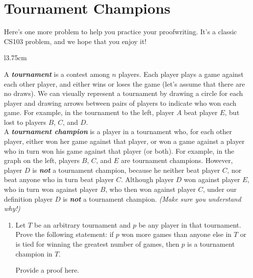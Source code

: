 \documentclass{article}
\renewcommand{\(}{\left(}
\renewcommand{\)}{\right)}
\theoremstyle{plain}
\theoremstyle{plain}
\theoremstyle{definition}
\renewcommand{\emph}[1]{\textit{\textbf{#1}}}
\begin{document}
\pagebreak

\section{Tournament Champions}
Here's one more problem to help you practice your proofwriting.
It's a classic CS103 problem,
and we hope that you enjoy it! \\

\begin{wrapfigure}{l}{3.75cm}
\end{wrapfigure}
A \emph{tournament} is a contest among $n$ players. Each player plays a game against each other player, and either wins or loses the game (let's assume that there are no draws). We can visually represent a tournament by drawing a circle for each player and drawing arrows between pairs of players to indicate who won each game. For example, in the tournament to the left, player $A$ beat player $E$, but lost to players $B$, $C$, and $D$. \\

A \emph{tournament champion} is a player in a tournament who, for each other player, either won her game against that player, or won a game against a player who in turn won his game against that player (or both). For example, in the graph on the left, players $B$, $C$, and $E$ are tournament champions. However, player $D$ is \emph{not} a tournament champion, because he neither beat player $C$, nor beat anyone who in turn beat player $C$. Although player $D$ won against player $E$, who in turn won against player $B$, who then won against player $C$, under our definition player $D$ is \emph{not} a tournament champion. \textit{(Make sure you understand why!)} \\

\begin{enumerate}[label*=\roman*.,ref=\roman*]
    \item Let $T$ be an arbitrary tournament and $p$ be any player in that tournament. Prove the following statement: if $p$ won more games than anyone else in $T$ or is tied for winning the greatest number of games, then $p$ is a tournament champion in $T$.
    
    \begin{shaded}
    Provide a proof here.
    \end{shaded}
\end{enumerate}
\end{document}
